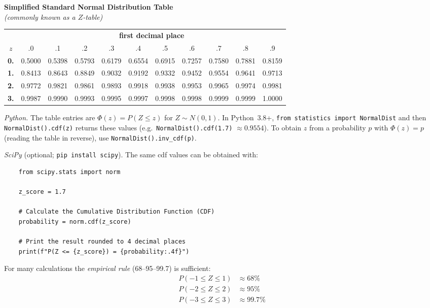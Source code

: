 \begin{center}
{\small\textbf{Simplified Standard Normal Distribution Table}\\[0.25em]
\footnotesize\textit{(commonly known as a $Z$-table)}\\[0.65em]}
\small
\renewcommand{\arraystretch}{1.35}
\begin{tabular}{@{}c | *{10}{c}@{}}
    \toprule
    & \multicolumn{10}{c}{\textbf{first decimal place}} \\
    $z$ & .0 & .1 & .2 & .3 & .4 & .5 & .6 & .7 & .8 & .9 \\
    \midrule
    \textbf{0.} & 0.5000 & 0.5398 & 0.5793 & 0.6179 & 0.6554 & 0.6915 & 0.7257 & 0.7580 & 0.7881 & 0.8159 \\
    \textbf{1.} & 0.8413 & 0.8643 & 0.8849 & 0.9032 & 0.9192 & 0.9332 & 0.9452 & \cellcolor{purple!22}0.9554 & 0.9641 & 0.9713 \\
    \textbf{2.} & 0.9772 & 0.9821 & 0.9861 & 0.9893 & 0.9918 & 0.9938 & 0.9953 & 0.9965 & 0.9974 & 0.9981 \\
    \textbf{3.} & 0.9987 & 0.9990 & 0.9993 & 0.9995 & 0.9997 & 0.9998 & 0.9998 & 0.9999 & 0.9999 & 1.0000 \\
    \bottomrule
\end{tabular}
\end{center}

\vspace{0.35cm}
\noindent\small
\textit{Python.}
The table entries are $\Phi(z)=P(Z\le z)$ for $Z\sim N(0,1)$.
In Python~3.8+, \texttt{from statistics import NormalDist} and then \texttt{NormalDist().cdf(z)} returns these values (e.g.\ \texttt{NormalDist().cdf(1.7)} $\approx 0.9554$).
To obtain $z$ from a probability $p$ with $\Phi(z)=p$ (reading the table in reverse), use \texttt{NormalDist().inv\_cdf(p)}.

\medskip
\noindent
\textit{SciPy} (optional; \texttt{pip install scipy}). The same cdf values can be obtained with:
\begin{verbatim}
    from scipy.stats import norm

    z_score = 1.7

    # Calculate the Cumulative Distribution Function (CDF)
    probability = norm.cdf(z_score)

    # Print the result rounded to 4 decimal places
    print(f"P(Z <= {z_score}) = {probability:.4f}")
\end{verbatim}


\vspace{0.45cm}
\noindent
For many calculations the \textit{empirical rule} (68--95--99.7) is sufficient:
\begin{align*}
    P(-1 \le Z \le 1) &\approx 68\% \\
    P(-2 \le Z \le 2) &\approx 95\% \\
    P(-3 \le Z \le 3) &\approx 99.7\%
\end{align*}




